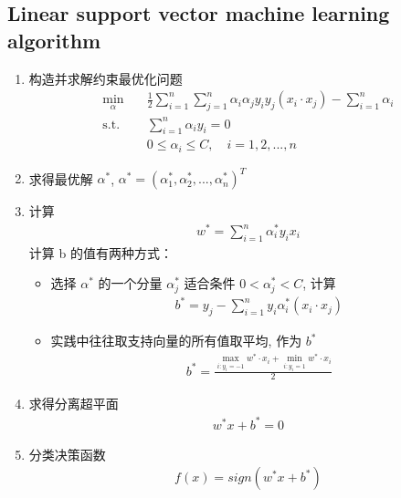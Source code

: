 \documentclass[oneside, 12pt]{ctexbook}
\begin{document}
			\subsection{\quad Linear support vector machine learning algorithm}
				\begin{enumerate}
					\item 构造并求解约束最优化问题
						\begin{align}
							\min\limits_{\alpha} \quad & \frac{1}{2}\sum_{i=1}^{n}\sum_{j=1}^{n} \alpha_i\alpha_j y_i y_j (x_i \cdot x_j) - \sum_{i=1}^{n}\alpha_i \\
							\text{s.t.} \quad &\sum_{i=1}^{n} \alpha_i y_i = 0\\
							&0 \leq \alpha_i \leq C, \quad i=1,2,...,n
						\end{align}
						
					\item 求得最优解 $\alpha^*$, $\alpha^* = (\alpha_1^*,\alpha_2^*,...,\alpha_n^*)^T$
					
					\item 计算
						\begin{align}
							w^* = \sum_{i=1}^{n} \alpha_i^* y_i x_i
						\end{align}
						计算 b 的值有两种方式：
						\begin{itemize}
							\item 选择 $\alpha^*$ 的一个分量 $\alpha_j^*$ 适合条件 $0 < \alpha_j^* < C$, 计算
								\begin{align}
									b^* = y_j - \sum_{i=1}^{n}y_i \alpha_i^*(x_i \cdot x_j)
								\end{align}
							
							\item 实践中往往取支持向量的所有值取平均, 作为 $b^*$
								\begin{align}
									b^* = \frac{\max\limits_{i: y_i=-1} w^* \cdot x_i + \min\limits_{i: y_i=1} w^* \cdot x_i}{2}
								\end{align}
						\end{itemize}
						
					\item 求得分离超平面
						\begin{align}
							w^* x + b^* = 0
						\end{align}
						
					\item 分类决策函数
						\begin{align}
							f(x) = sign(w^* x + b^*)
						\end{align}
				\end{enumerate}
			
\end{document}
